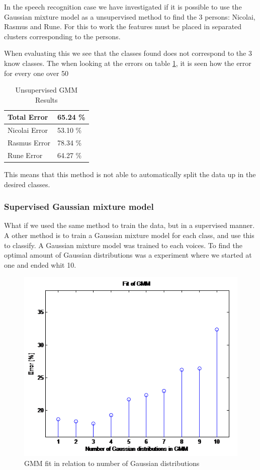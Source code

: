 In the speech recognition case we have investigated if it is possible to use the Gaussian mixture model as a unsupervised method to find the 3 persons: Nicolai, Rasmus and Rune. For this to work the features must be placed in separated clusters corresponding to the persons. 

When evaluating this we see that the classes found does not correspond to the 3 know classes. The when looking at the errors on table \ref{tab:resultTableUGMM}, it is seen how the error for every one over 50%


\begin{table}[H]
\centering
\begin{tabular}{ll}
\hline
Total Error   & 65.24 \% \\ \hline
Nicolai Error & 53.10 \% \\
Rasmus Error  & 78.34 \% \\
Rune Error    & 64.27 \% \\ \hline
\end{tabular}
\caption{Unsupervised GMM Results}
\label{tab:resultTableUGMM}
\end{table}
 
This means that this method is not able to automatically split the data up in the desired classes.
 
\subsubsection{Supervised Gaussian mixture model}
\label{sec:EMGMM}

What if we used the same method to train the data, but in a supervised manner. A other method is to train a Gaussian mixture model for each class, and use this to classify. A Gaussian mixture model was trained to each voices. To find the optimal amount of Gaussian distributions was a experiment where we started at one and ended whit 10.

\begin{figure}[H]
\centering
\includegraphics[scale=0.7]{billeder/fitGmm}
\caption{GMM fit in relation to number of Gaussian distributions}
\label{fig:fitGMM}
\end{figure}

